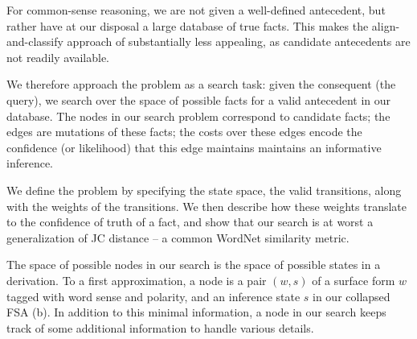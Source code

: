 For common-sense reasoning, we are not given a well-defined
  antecedent, but rather have at our disposal a large database of
  true facts.
This makes the align-and-classify approach of 
   substantially
  less appealing, as candidate antecedents are not readily available.

We therefore approach the problem as a search task: given the
  consequent (the query), we search over the space of possible facts for
  a valid antecedent in our database.
The nodes in our search problem correspond to candidate facts; the
  edges are mutations of these facts; the costs over these edges encode
  the confidence (or likelihood) that this edge
  maintains maintains an informative inference.

We define the problem by specifying the state space,
  the valid transitions, along with the weights of
  the transitions.
We then describe how these weights translate to the confidence of truth
  of a fact, and show that our search is at worst a generalization of
  JC distance \cite{key:1997jc-similarity} -- a common WordNet similarity
  metric.

%
%
The space of possible nodes in our search is the space of possible
  states in a derivation.
To a first approximation, a node is a pair $(w, s)$ of a surface form
  $w$ tagged with word sense and polarity,
  and an inference state $s$ in our collapsed FSA (b).
In addition to this minimal information, a node in our search keeps
  track of some additional information to handle various details.

%

